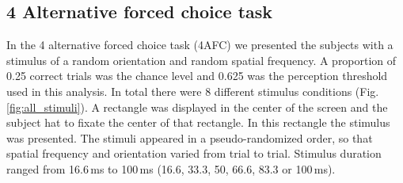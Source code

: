 \subsection{4 Alternative forced choice task}

In the 4 alternative forced choice task (4AFC) we presented the subjects with a stimulus of a random orientation and random spatial frequency. A proportion of 0.25 correct trials was the chance level and 0.625 was the perception threshold used in this analysis. In total there were 8 different stimulus conditions (Fig. \ref{fig:all_stimuli}). A rectangle was displayed in the center of the screen and the subject hat to fixate the center of that rectangle. In this rectangle the stimulus was presented. The stimuli appeared in a pseudo-randomized order, so that spatial frequency and orientation varied from trial to trial. Stimulus duration ranged from 16.6\,ms to 100\,ms (16.6, 33.3, 50, 66.6, 83.3 or 100\,ms). 

